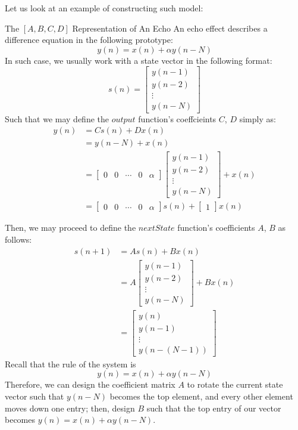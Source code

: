 Let us look at an example of constructing such model:
\begin{ln-example}{The $[A, B, C, D]$ Representation of An Echo}{}
    An echo effect describes a difference equation in the following prototype:
    \[
        y(n) = x(n) + \alpha y (n - N)
    \]
    In such case, we usually work with a state vector in the following format:
    \[
        s(n) = \begin{bmatrix} y(n - 1) \\ y(n - 2) \\ \vdots \\ y(n - N) \end{bmatrix}
    \]
    Such that we may define the $output$ function's coeffcieints $C$, $D$ simply as:
    \begin{align*}
        y(n) &= C s(n) + D x(n) \\
        &= y(n - N) + x(n) \\
        &= \begin{bmatrix} 0 & 0 & \cdots & 0 & \alpha \end{bmatrix} \begin{bmatrix} y(n - 1) \\ y(n - 2) \\ \vdots \\ y(n - N) \end{bmatrix} + x(n) \\
        &= \begin{bmatrix} 0 & 0 & \cdots & 0 & \alpha \end{bmatrix} s(n) + \begin{bmatrix} 1 \end{bmatrix} x(n)
    \end{align*}

    Then, we may proceed to define the $nextState$ function's coefficients $A$, $B$ as follows:
    \begin{align*}
        s(n + 1) &= A s(n) + B x(n) \\
        &= A \begin{bmatrix} y(n - 1) \\ y(n - 2) \\ \vdots \\ y(n - N) \end{bmatrix} + B x(n) \\
        &= \begin{bmatrix} y(n) \\ y(n - 1) \\ \vdots \\ y(n - (N - 1)) \end{bmatrix}
    \end{align*}
    Recall that the rule of the system is
    \[
        y(n) = x(n) + \alpha y (n - N)
    \]
    Therefore, we can design the coefficient matrix $A$ to rotate the current state vector such that $y(n - N)$ becomes the top element, and every other element moves down one entry; then, design $B$ such that the top entry of our vector becomes $y(n) = x(n) + \alpha y (n - N)$.


\end{ln-example}
